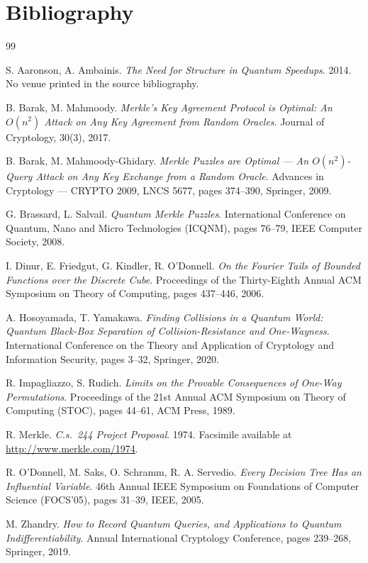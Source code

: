 \documentclass{aicr-conjecture}
\begin{document}
\section{Bibliography}

\begin{aicrbibliography}{99}

S. Aaronson, A. Ambainis.
\emph{The Need for Structure in Quantum Speedups}.
2014. No venue printed in the source bibliography.

B. Barak, M. Mahmoody.
\emph{Merkle's Key Agreement Protocol is Optimal: An $O(n^2)$ Attack on
Any Key Agreement from Random Oracles}.
Journal of Cryptology, 30(3), 2017.

B. Barak, M. Mahmoody-Ghidary.
\emph{Merkle Puzzles are Optimal --- An $O(n^2)$-Query Attack on Any Key
Exchange from a Random Oracle}.
Advances in Cryptology --- CRYPTO 2009, LNCS 5677, pages 374--390,
Springer, 2009.

G. Brassard, L. Salvail.
\emph{Quantum Merkle Puzzles}.
International Conference on Quantum, Nano and Micro Technologies
(ICQNM), pages 76--79, IEEE Computer Society, 2008.

I. Dinur, E. Friedgut, G. Kindler, R. O'Donnell.
\emph{On the Fourier Tails of Bounded Functions over the Discrete Cube}.
Proceedings of the Thirty-Eighth Annual ACM Symposium on Theory of
Computing, pages 437--446, 2006.

A. Hosoyamada, T. Yamakawa.
\emph{Finding Collisions in a Quantum World: Quantum Black-Box
Separation of Collision-Resistance and One-Wayness}.
International Conference on the Theory and Application of Cryptology and
Information Security, pages 3--32, Springer, 2020.

R. Impagliazzo, S. Rudich.
\emph{Limits on the Provable Consequences of One-Way Permutations}.
Proceedings of the 21st Annual ACM Symposium on Theory of Computing
(STOC), pages 44--61, ACM Press, 1989.

R. Merkle.
\emph{C.s.\ 244 Project Proposal}.
1974. Facsimile available at \url{http://www.merkle.com/1974}.

R. O'Donnell, M. Saks, O. Schramm, R. A. Servedio.
\emph{Every Decision Tree Has an Influential Variable}.
46th Annual IEEE Symposium on Foundations of Computer Science
(FOCS'05), pages 31--39, IEEE, 2005.

M. Zhandry.
\emph{How to Record Quantum Queries, and Applications to Quantum
Indifferentiability}.
Annual International Cryptology Conference, pages 239--268, Springer,
2019.

\end{aicrbibliography}
\end{document}
